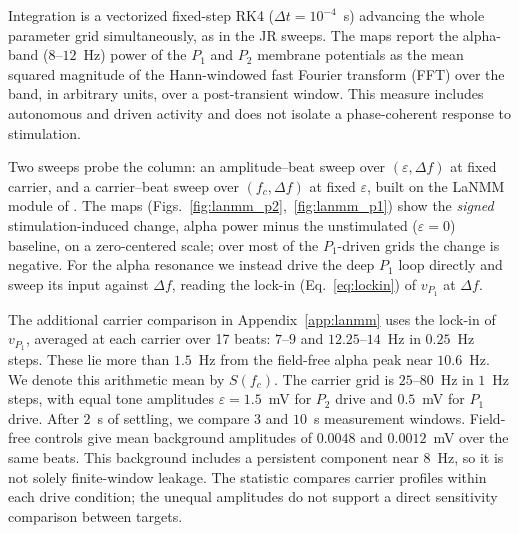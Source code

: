 \documentclass[11pt,a4paper]{article}
\begin{document}
Integration is a vectorized fixed-step RK4
($\Delta t=10^{-4}$~s) advancing the whole parameter grid simultaneously, as in the JR
sweeps. The maps report the
alpha-band ($8$--$12$~Hz) power of the $P_1$ and $P_2$ membrane potentials as the mean
squared magnitude of the Hann-windowed fast Fourier transform (FFT) over the band, in arbitrary units, over a
post-transient window. This measure includes autonomous and driven activity and
does not isolate a phase-coherent response to stimulation.

Two sweeps probe the column: an amplitude--beat sweep over
$(\varepsilon,\Delta f)$ at fixed carrier, and a carrier--beat sweep
over $(f_c,\Delta f)$ at fixed $\varepsilon$, built on the LaNMM module of
\cite{ruffini2025cfc}. The maps
(Figs.~\ref{fig:lanmm_p2},~\ref{fig:lanmm_p1}) show the \emph{signed} stimulation-induced
change, alpha power minus the unstimulated ($\varepsilon=0$) baseline, on a zero-centered
scale; over most of the $P_1$-driven grids the change is negative. For the
alpha resonance we instead drive the deep $P_1$ loop directly and sweep its input against
$\Delta f$, reading the lock-in (Eq.~\eqref{eq:lockin}) of $v_{P_1}$ at $\Delta f$.

The additional carrier comparison in Appendix~\ref{app:lanmm} uses the lock-in
of $v_{P_1}$, averaged at each carrier over 17 beats: $7$--$9$ and
$12.25$--$14$~Hz in $0.25$~Hz steps. These lie more than $1.5$~Hz from the
field-free alpha peak near $10.6$~Hz. We denote this arithmetic mean by $S(f_c)$.
The carrier grid is $25$--$80$~Hz in $1$~Hz steps, with equal tone amplitudes
$\varepsilon=1.5$~mV for $P_2$ drive and $0.5$~mV for $P_1$ drive. After $2$~s
of settling, we compare $3$ and $10$~s measurement windows. Field-free controls
give mean background amplitudes of $0.0048$ and $0.0012$~mV over the same beats.
This background includes a persistent component near $8$~Hz, so it is not solely
finite-window leakage. The statistic compares carrier profiles within each drive
condition; the unequal amplitudes do not support a direct sensitivity comparison
between targets.
\end{document}
